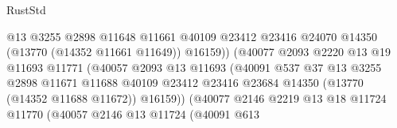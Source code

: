 \begin{lexlean}{RustStd}
\begin{coremodule}
                                            @13
                                            @3255
                                            @2898
                                            @11648
                                            @11661
                                            @40109
                                            @23412
                                            @23416
                                            @24070
                                            @14350
                                            (@13770 (@14352 @11661 @11649))
                                            @16159))
                                        (@40077
                                          @2093
                                          @2220
                                          @13
                                          @19
                                          @11693
                                          @11771
                                          (@40057
                                            @2093
                                            @13
                                            @11693
                                            (@40091
                                              @537
                                              @37
                                              @13
                                              @3255
                                              @2898
                                              @11671
                                              @11688
                                              @40109
                                              @23412
                                              @23416
                                              @23684
                                              @14350
                                              (@13770 (@14352 @11688 @11672))
                                              @16159))
                                          (@40077
                                            @2146
                                            @2219
                                            @13
                                            @18
                                            @11724
                                            @11770
                                            (@40057
                                              @2146
                                              @13
                                              @11724
                                              (@40091
                                                @613

\end{coremodule}
\end{lexlean}
